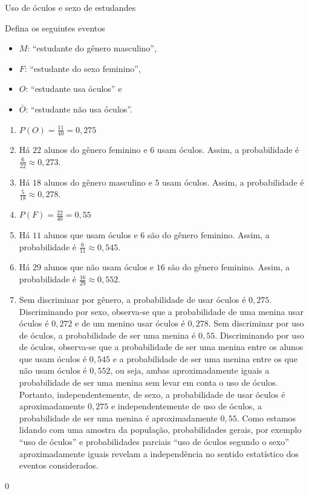 \begin{answer}{Uso de óculos e sexo de estudandes}
{
Defina os seguintes eventos

\begin{itemize}
\item $M$: “estudante do gênero masculino”, 
\item $F$: “estudante do sexo feminino”,
\item $O$: “estudante usa óculos”{} e 
\item $\overline{O}$: “estudante não usa óculos”.
\end{itemize}

\begin{enumerate}
\item $P(O)=\frac{11}{40}=0{,}275$
\item Há $22$ alunos do gênero feminino e 6 usam óculos. Assim, a probabilidade é $\frac{6}{22}\approx0{,}273$.
\item Há $18$ alunos do gênero masculino e $5$ usam óculos. Assim, a probabilidade é $\frac{5}{18}\approx0{,}278$.
\item $P(F)=\frac{22}{40}=0{,}55$
\item Há $11$ alunos que usam óculos e 6 são do gênero feminino. Assim, a probabilidade é $\frac{6}{11}\approx0{,}545$.
\item Há $29$ alunos que não usam óculos e $16$ são do gênero feminino. Assim, a probabilidade é $\frac{16}{29}\approx0{,}552$.
\item Sem discriminar por gênero, a probabilidade de usar óculos é $0{,}275$. Discriminando por sexo, observa-se que a probabilidade de uma menina usar óculos é $0{,}272$ e de um menino usar óculos é $0{,}278$. Sem discriminar por uso de óculos, a probabilidade de ser uma menina é $0{,}55$. Discriminando por uso de óculos, observa-se que a probabilidade de ser uma menina entre os alunos que usam óculos é $0{,}545$ e a probabilidade de ser uma menina entre os que não usam óculos é $0{,}552$, ou seja, ambas aproximadamente iguais a probabilidade de ser uma menina sem levar em conta o uso de óculos. Portanto, independentemente, de sexo, a probabilidade de usar óculos é aproximadamente $0{,}275$ e independentemente de uso de óculos, a probabilidade de ser uma menina é aproximadamente $0{,}55$. Como estamos lidando com uma amostra da população, probabilidades gerais, por exemplo “uso de óculos”{} e probabilidades parciais “uso de óculos segundo o sexo”{} aproximadamente iguais revelam a independência no sentido estatístico dos eventos considerados.
\end{enumerate}
}{0}
\end{answer}


